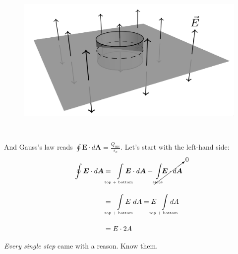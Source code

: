 \documentclass{article}
\begin{document}
\begin{minipage}{0.58\textwidth}
\begin{figure}[H]
\centering
\includegraphics[width=\textwidth]{figures/2l8.png}
\end{figure}
\end{minipage}
~
\begin{minipage}{0.4\textwidth}
And Gauss's law reads $\displaystyle \oint \bm{E} \cdot d\bm{A} = \frac{Q_{\text{enc}}}{\epsilon_o}$. 
\vspace{0.8em}
Let's start with the left-hand side:
\begin{align*}
    \oint \bm{E} \cdot d\bm{A} &= \hspace{-1em} \int\limits_{\text{\tiny top + bottom}} \hspace{-1.5em} \bm{E} \cdot d\bm{A} + \cancelto{0}{\int\limits_{\text{\tiny sides}} \hspace{-0.5em} \bm{E} \cdot d\bm{A}} \\[1em]
                               &= \hspace{-1em} \int\limits_{\text{\tiny top + bottom}} \hspace{-1.5em} E\ dA = E \hspace{-1em} \int\limits_{\text{\tiny top + bottom}} \hspace{-1.5em} dA \\[1em]
                               &= E \cdot 2A
\end{align*}
\end{minipage}

\vspace{1em}

\begin{center}
\emph{Every single step} came with a reason. Know them.
\end{center}

\vspace{1em}
\end{document}
